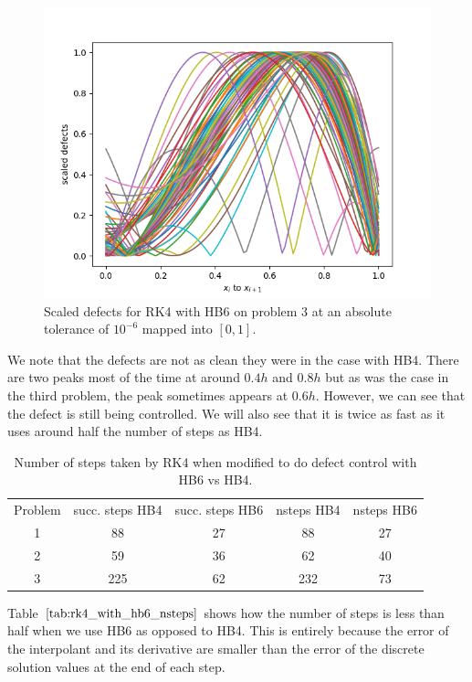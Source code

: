 \begin{figure}[H]
\centering
\includegraphics[width=0.7\linewidth]{./figures/rk4_with_hb6_p3_scaled_defects}
\caption{Scaled defects for RK4 with HB6 on problem 3 at an absolute tolerance of $10^{-6}$ mapped into $[0, 1]$.}
\label{fig:rk4_with_hb6_p3_scaled_defects}
\end{figure}

We note that the defects are not as clean they were in the case with HB4. There are two peaks most of the time at around $0.4h$ and $0.8h$ but as was the case in the third problem, the peak sometimes appears at $0.6h$. However, we can see that the defect is still being controlled. We will also see that it is twice as fast as it uses around half the number of steps as HB4.

\begin{table}[h]
\caption {Number of steps taken by RK4 when modified to do defect control with HB6 vs HB4.} \label{tab:rk4_with_hb6_nsteps}
\begin{center}
\begin{tabular}{ c c c c c } 
Problem & succ. steps HB4 & succ. steps HB6 & nsteps HB4  & nsteps HB6 \\ 
1       & 88                 &        27          & 88         & 27 \\ 
2       & 59                 &        36          & 62         & 40 \\
3       & 225                &        62          & 232        & 73 \\
\end{tabular}
\end{center}
\end{table}

Table $\ref{tab:rk4_with_hb6_nsteps}$ shows how the number of steps is less than half when we use HB6 as opposed to HB4. This is entirely because the error of the interpolant and its derivative are smaller than the error of the discrete solution values at the end of each step.

